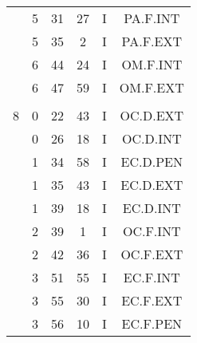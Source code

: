 \documentclass[12pt, a4paper]{article}
\begin{document}
\begin{multicols}{3}
{\begin{tabular}{c c c c c c}
	 	 	 	 & 5 & 31 & 27 & I & PA.F.INT\\%
	 	 	 	 & 5 & 35 & 2 & I & PA.F.EXT\\%
	 	 	 	 & 6 & 44 & 24 & I & OM.F.INT\\%
	 	 	 	 & 6 & 47 & 59 & I & OM.F.EXT\\%
	 	 	 	 & & & & & \\%
	 	 	 	8 & 0 & 22 & 43 & I & OC.D.EXT\\%
	 	 	 	 & 0 & 26 & 18 & I & OC.D.INT\\%
	 	 	 	 & 1 & 34 & 58 & I & EC.D.PEN\\%
	 	 	 	 & 1 & 35 & 43 & I & EC.D.EXT\\%
	 	 	 	 & 1 & 39 & 18 & I & EC.D.INT\\%
	 	 	 	 & 2 & 39 & 1 & I & OC.F.INT\\%
	 	 	 	 & 2 & 42 & 36 & I & OC.F.EXT\\%
	 	 	 	 & 3 & 51 & 55 & I & EC.F.INT\\%
	 	 	 	 & 3 & 55 & 30 & I & EC.F.EXT\\%
	 	 	 	 & 3 & 56 & 10 & I & EC.F.PEN\\%
	 	 \end{tabular}
 	}
\end{multicols}
\end{document}
